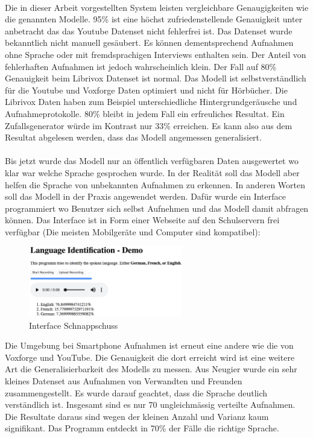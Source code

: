 \\
Die in dieser Arbeit vorgestellten System leisten vergleichbare Genaugigkeiten wie die genannten Modelle. 95\% ist eine höchst zufriedenstellende Genauigkeit unter anbetracht das das Youtube Datenset nicht fehlerfrei ist. Das Datenset wurde bekanntlich nicht manuell gesäubert. Es können dementsprechend Aufnahmen ohne Sprache oder mit fremdsprachigen Interviews enthalten sein. Der Anteil von fehlerhaften Aufnahmen ist jedoch wahrscheinlich klein. 
Der Fall auf 80\% Genauigkeit beim Librivox Datenset ist normal. Das Modell ist selbstverständlich für die Youtube und Voxforge Daten optimiert und nicht für Hörbücher. Die Librivox Daten haben zum Beispiel unterschiedliche Hintergrundgeräusche und Aufnahmeprotokolle. 80\% bleibt in jedem Fall ein erfreuliches Resultat. Ein Zufallsgenerator würde im Kontrast nur 33\% erreichen. Es kann also aus dem Resultat abgelesen werden, dass das Modell angemessen generalisiert. 
\\ \\
Bis jetzt wurde das Modell nur an öffentlich verfügbaren Daten ausgewertet wo klar war welche Sprache gesprochen wurde. In der Realität soll das Modell aber helfen die Sprache von unbekannten Aufnahmen zu erkennen. In anderen Worten soll das Modell in der Praxis angewendet werden. Dafür wurde ein Interface programmiert wo Benutzer sich selbst Aufnehmen und das Modell damit abfragen können. Das Interface ist in Form einer Webseite auf den Schulservern frei verfügbar (Die meisten Mobilgeräte und Computer sind kompatibel):
\begin{figure}[hbt]
	\centering
		\includegraphics[width=0.6\textwidth]{assets/interface.png}
	\caption{Interface Schnappschuss}
	\label{img:interface}
\end{figure}
Die Umgebung bei Smartphone Aufnahmen ist erneut eine andere wie die von Voxforge und YouTube. Die Genauigkeit die dort erreicht wird ist eine weitere Art die Generalisierbarkeit des Modells zu messen. Aus Neugier wurde ein sehr kleines Datenset aus Aufnahmen von Verwandten und Freunden zusammengestellt. Es wurde darauf geachtet, dass die Sprache deutlich verständlich ist. Insgesamt sind es nur 70 ungleichmässig verteilte Aufnahmen. Die Resultate daraus sind wegen der kleinen Anzahl und Varianz kaum signifikant. Das Programm entdeckt in 70\% der Fälle die richtige Sprache. 

